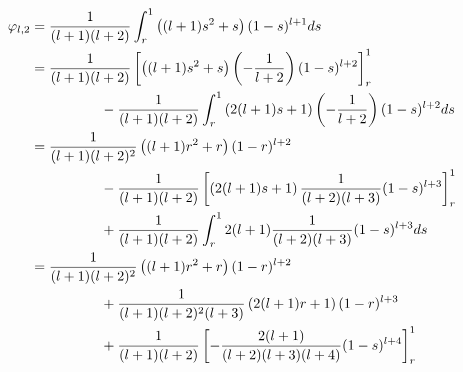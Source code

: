 \begin{align}
    \phi_{l,2}
     & = \frac{1}{(l+1)(l+2)} \int_r^1 \left( (l+1)s^2 + s \right) (1 - s)^{l+1} ds
    \notag                                                                                                             \\
     & = \frac{1}{(l+1)(l+2)} \left[ \left( (l+1)s^2 + s \right) \left( -\frac{1}{l+2} \right) (1-s)^{l+2} \right]_r^1
    \notag                                                                                                             \\
     & \hspace{5em}
    - \frac{1}{(l+1)(l+2)} \int_r^1 \left( 2(l+1)s + 1 \right) \left( -\frac{1}{l+2} \right) (1-s)^{l+2} ds
    \notag                                                                                                             \\
     & = \frac{1}{(l+1)(l+2)^2} \left( (l+1)r^2 + r \right) (1-r)^{l+2}
    \notag                                                                                                             \\
     & \hspace{5em}
    - \frac{1}{(l+1)(l+2)} \left[ \left( 2(l+1)s + 1 \right) \frac{1}{(l+2)(l+3)} (1-s)^{l+3} \right]_r^1
    \notag                                                                                                             \\
     & \hspace{5em}
    + \frac{1}{(l+1)(l+2)} \int_r^1 2(l+1) \frac{1}{(l+2)(l+3)} (1-s)^{l+3} ds
    \notag                                                                                                             \\
     & = \frac{1}{(l+1)(l+2)^2} \left( (l+1)r^2 + r \right) (1-r)^{l+2}
    \notag                                                                                                             \\
     & \hspace{5em}
    + \frac{1}{(l+1)(l+2)^2(l+3)} \left( 2(l+1)r + 1 \right) (1-r)^{l+3}
    \notag                                                                                                             \\
     & \hspace{5em}
    + \frac{1}{(l+1)(l+2)} \left[ -\frac{2(l+1)}{(l+2)(l+3)(l+4)} (1-s)^{l+4} \right]_r^1
    \notag                                                                                                             \\

\end{align}
